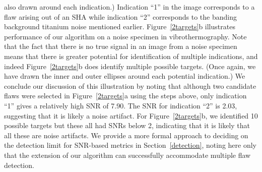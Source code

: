 \documentclass[12pt]{article}
\begin{document}
also drawn around each indication.) Indication  ``1'' in the image 
corresponds to a flaw  arising out of an SHA while indication ``2''
corresponds to the banding background  titanium  noise mentioned
earlier. Figure~\ref{2targets}b illustrates performance of our
algorithm on a noise specimen in vibrothermography. Note that the fact
that there is no true signal in an image from a noise specimen means
that there is greater potential 
for identification of multiple indications, and indeed
Figure~\ref{2targets}b does identify multiple possible targets. (Once
again, we have drawn the inner and outer ellipses around each
potential indication.) We conclude our 
discussion of this illustration by noting that although two candidate
flaws were selected in Figure~\ref{2targets}a using the steps above,
only indication ``1'' gives a relatively high SNR of 7.90. The SNR for
indication ``2'' is  2.03, suggesting that it is likely a noise
artifact. For Figure~\ref{2targets}b, we identified 10 possible
targets but these all had SNRs below 2, indicating that it is likely
that all these are noise artifacts. We provide a more 
formal approach to deciding  on the detection limit for SNR-based
metrics in Section~\ref{detection}, noting here only  that the extension of
our algorithm can successfully  accommodate multiple flaw detection.
 
\end{document}
